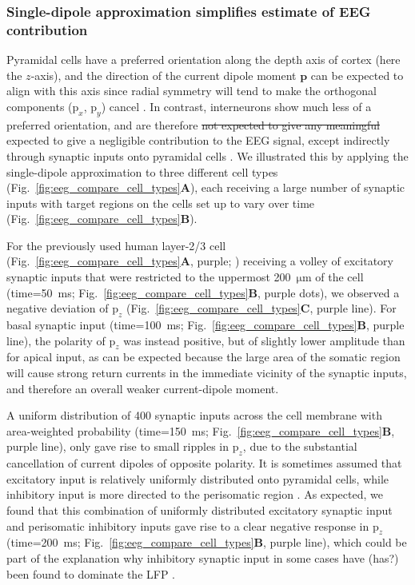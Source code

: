 \documentclass[preprint,10pt,authoryear]{elsarticle}
\newcommand{\hlp}[2][Purple]{ {\sethlcolor{#1} \hl{#2}} }
\newcommand{\gen}[1]{\color{white}{\hlp{GTE: #1 }}\color{black}}
\newcommand{\gex}[1]{{\color{Orange}#1}}
\begin{document}
\subsubsection{Single-dipole approximation simplifies estimate of EEG contribution}

Pyramidal cells have a preferred orientation along the depth axis of cortex (here the $z$-axis), and the direction of the current dipole moment $\mathbf{p}$ can be expected to align with this axis since
radial symmetry will tend to make the orthogonal components ($\text{p}_x$, $\text{p}_y$) cancel \citep{HAGEN2018}. 
\gen{Boer det ikke vaere italic, dvs $p_x$, $p_y$?}
In contrast, interneurons show much less of a preferred orientation, and are therefore 
\gex{\sout{not expected to give any meaningful} expected to give a negligible} contribution to the EEG signal, except indirectly \gex{through synaptic inputs onto} pyramidal cells \citep{HAGEN2016}.
We illustrated this by applying the single-dipole approximation to three different cell types (Fig.~\ref{fig:eeg_compare_cell_types}\textbf{A}), each receiving a large number of synaptic inputs with target regions on the cells \gex{set up to vary over time} (Fig.~\ref{fig:eeg_compare_cell_types}\textbf{B}).

For the previously used human layer-2/3 cell (Fig.~\ref{fig:eeg_compare_cell_types}\textbf{A}, purple; \cite{EYAL2016})
receiving a \gex{volley} of excitatory synaptic inputs that were restricted to the uppermost 200~$\si{\um}$ of the cell (time=50~ms; Fig.~\ref{fig:eeg_compare_cell_types}\textbf{B}, purple dots), we observed a negative deviation of $\text{p}_z$ (Fig.~\ref{fig:eeg_compare_cell_types}\textbf{C}, purple line). For basal synaptic input (time=100~ms; Fig.~\ref{fig:eeg_compare_cell_types}\textbf{B}, purple line), the polarity of $\text{p}_z$ was instead positive, but of slightly lower amplitude than for apical input, as can be expected because the large area of the somatic region will cause strong return currents in the immediate vicinity of the synaptic inputs, and therefore an overall weaker current-dipole moment.


A uniform distribution of 400 synaptic inputs across the cell membrane with area-weighted probability (time=150~ms; Fig.~\ref{fig:eeg_compare_cell_types}\textbf{B}, purple line), only gave rise to small ripples in $\text{p}_z$, due to the substantial cancellation of current dipoles of opposite polarity. It is sometimes assumed that excitatory input is relatively uniformly distributed onto pyramidal cells, while inhibitory input is more directed to the perisomatic region \citep{Mazzoni2015, Telenczuk2019, Skaar2020, Telenczuk2020}. As expected, we found that \gex{this combination of uniformly distributed excitatory synaptic input and} perisomatic inhibitory inputs gave rise to a clear negative response in $\text{p}_z$ (time=200~ms; Fig.~\ref{fig:eeg_compare_cell_types}\textbf{B}, purple line), which could be part of the explanation why inhibitory synaptic input in some cases have \gex{(has?}) been found to dominate the LFP \citep{HAGEN2016, TELENCZUK2016}.
\end{document}
